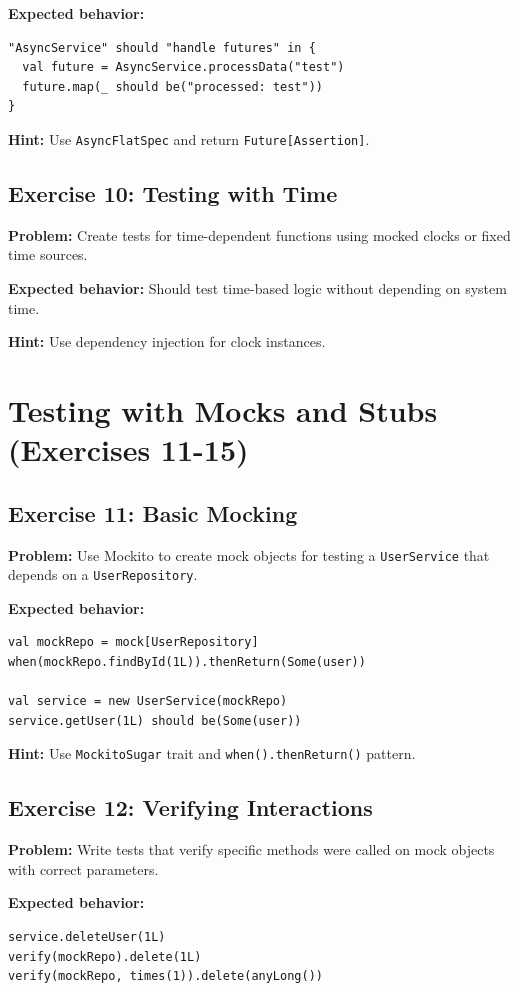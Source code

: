 \documentclass[12pt,a4paper]{article}
\begin{document}
\textbf{Expected behavior:}
\begin{lstlisting}
"AsyncService" should "handle futures" in {
  val future = AsyncService.processData("test")
  future.map(_ should be("processed: test"))
}
\end{lstlisting}

\textbf{Hint:} Use \texttt{AsyncFlatSpec} and return \texttt{Future[Assertion]}.

\subsection{Exercise 10: Testing with Time}
\textbf{Problem:} Create tests for time-dependent functions using mocked clocks or fixed time sources.

\textbf{Expected behavior:} Should test time-based logic without depending on system time.

\textbf{Hint:} Use dependency injection for clock instances.

\section{Testing with Mocks and Stubs (Exercises 11-15)}

\subsection{Exercise 11: Basic Mocking}
\textbf{Problem:} Use Mockito to create mock objects for testing a \texttt{UserService} that depends on a \texttt{UserRepository}.

\textbf{Expected behavior:}
\begin{lstlisting}
val mockRepo = mock[UserRepository]
when(mockRepo.findById(1L)).thenReturn(Some(user))

val service = new UserService(mockRepo)
service.getUser(1L) should be(Some(user))
\end{lstlisting}

\textbf{Hint:} Use \texttt{MockitoSugar} trait and \texttt{when().thenReturn()} pattern.

\subsection{Exercise 12: Verifying Interactions}
\textbf{Problem:} Write tests that verify specific methods were called on mock objects with correct parameters.

\textbf{Expected behavior:}
\begin{lstlisting}
service.deleteUser(1L)
verify(mockRepo).delete(1L)
verify(mockRepo, times(1)).delete(anyLong())
\end{lstlisting}
\end{document}
